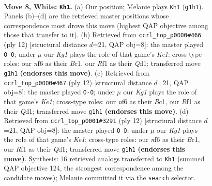 \documentclass[11pt]{article}
\begin{document}
\begin{figure}[p]\centering
\begin{subfigure}{0.46\textwidth}\centering
\resizebox{\linewidth}{!}{%
\newchessgame
\chessboard[
  setfen={r1bq1rk1/pppnppb1/3p1np1/7p/2PP4/2N2NP1/PP2PPBP/R1BQ1RK1 w - - 0 8},
  showmover=false,
  pgfstyle=straightmove, color=movearrow, markmove={g1-h1}
]}
\caption{}
\end{subfigure}\hfill
\begin{subfigure}{0.46\textwidth}\centering
\resizebox{\linewidth}{!}{%
\newchessgame
\chessboard[
  setfen={r1bq1rk1/pppnppbp/3p1np1/8/2PP4/2N2NP1/PP2PPBP/R1BQK2R w KQ - 1 7},
  showmover=false,
  pgfstyle=straightmove, color=movearrow, markmove={e1-g1}
]}
\caption{}
\end{subfigure}
\\[4pt]
\begin{subfigure}{0.46\textwidth}\centering
\resizebox{\linewidth}{!}{%
\newchessgame
\chessboard[
  setfen={r1bq1rk1/pppnppbp/3p1np1/8/2PP4/2N2NP1/PP2PPBP/R1BQK2R w KQ - 1 7},
  showmover=false,
  pgfstyle=straightmove, color=movearrow, markmove={e1-g1}
]}
\caption{}
\end{subfigure}\hfill
\begin{subfigure}{0.46\textwidth}\centering
\resizebox{\linewidth}{!}{%
\newchessgame
\chessboard[
  setfen={r1bq1rk1/pppnppbp/3p1np1/8/2PP4/2N2NP1/PP2PPBP/R1BQK2R w KQ - 5 7},
  showmover=false,
  pgfstyle=straightmove, color=movearrow, markmove={e1-g1}
]}
\caption{}
\end{subfigure}
\caption{\textbf{Move 8, White: \texttt{Kh1}.} (a) Our position; Melanie plays \texttt{Kh1} (\texttt{g1h1}). Panels (b)--(d) are the retrieved master positions whose correspondence most drove this move (highest QAP objective among those that transfer to it). (b) Retrieved from \texttt{ccrl\_top\_p0000\#466} (ply 12) [structural distance $d$=21, QAP obj=8]: the master played \texttt{O-O}; under $\mu$ our \emph{Kg1} plays the role of that game's \emph{Ke1}; cross-type roles: our \emph{n}f6 as their \emph{B}c1, our \emph{R}f1 as their \emph{Q}d1; transferred move \texttt{g1h1} \textbf{(endorses this move)}. (c) Retrieved from \texttt{ccrl\_top\_p0000\#467} (ply 12) [structural distance $d$=21, QAP obj=8]: the master played \texttt{O-O}; under $\mu$ our \emph{Kg1} plays the role of that game's \emph{Ke1}; cross-type roles: our \emph{n}f6 as their \emph{B}c1, our \emph{R}f1 as their \emph{Q}d1; transferred move \texttt{g1h1} \textbf{(endorses this move)}. (d) Retrieved from \texttt{ccrl\_top\_p0001\#3291} (ply 12) [structural distance $d$=21, QAP obj=8]: the master played \texttt{O-O}; under $\mu$ our \emph{Kg1} plays the role of that game's \emph{Ke1}; cross-type roles: our \emph{n}f6 as their \emph{B}c1, our \emph{R}f1 as their \emph{Q}d1; transferred move \texttt{g1h1} \textbf{(endorses this move)}. Synthesis: 16 retrieved analogs transferred to \texttt{Kh1} (summed QAP objective 124, the strongest correspondence among the candidate moves); Melanie committed it via the \texttt{search} selector.}
\label{fig:thought-m14}
\end{figure}
\end{document}
